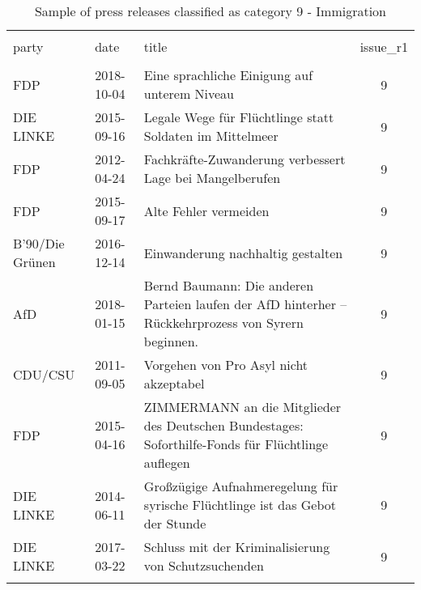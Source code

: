 
\begin{table}[!htbp] \centering 
  \caption{Sample of press releases classified as category 9 - Immigration} 
  \label{tab:9-document-samples} 
\begin{tabularx}{\textwidth}{stXc} 
\\[-1.8ex]\hline 
\hline \\[-1.8ex] 
party & date & title & issue\_r1 \\ 
\hline \\[-1.8ex] 
FDP & 2018-10-04 & Eine sprachliche Einigung auf unterem Niveau & 9 \\ 
DIE LINKE & 2015-09-16 & Legale Wege für Flüchtlinge statt Soldaten im Mittelmeer & 9 \\ 
FDP & 2012-04-24 & Fachkräfte-Zuwanderung verbessert Lage bei Mangelberufen & 9 \\ 
FDP & 2015-09-17 & Alte Fehler vermeiden & 9 \\ 
B'90/Die Grünen & 2016-12-14 & Einwanderung nachhaltig gestalten & 9 \\ 
AfD & 2018-01-15 & Bernd Baumann: Die anderen Parteien laufen der AfD hinterher – Rückkehrprozess von Syrern beginnen. & 9 \\ 
CDU/CSU & 2011-09-05 & Vorgehen von Pro Asyl nicht akzeptabel & 9 \\ 
FDP & 2015-04-16 & ZIMMERMANN an die Mitglieder des Deutschen Bundestages: Soforthilfe-Fonds für Flüchtlinge auflegen & 9 \\ 
DIE LINKE & 2014-06-11 & Großzügige Aufnahmeregelung für syrische Flüchtlinge ist das Gebot der Stunde & 9 \\ 
DIE LINKE & 2017-03-22 & Schluss mit der Kriminalisierung von Schutzsuchenden & 9 \\ 
\hline \\[-1.8ex] 
\end{tabularx} 
\end{table} 
